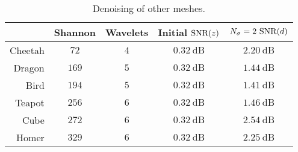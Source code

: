 \begin{table}
    \centering
    \caption[
        Denoising of other meshes
    ]{
        Denoising of other meshes.
    }\label{tab:chapter5_denoising}
    \begin{tabular}{@{}rcccc@{}}
        \toprule
                & Shannon       & Wavelets    & Initial \(\text{SNR}(z)\) & \(N_{\sigma}=2\ \snr{d}\) \\
        \midrule
        Cheetah & \(\num{72}\)  & \(\num{4}\) & \(\SI{0.32}{\dB}\)  & \(\SI{2.20}{\dB}\)        \\
        Dragon  & \(\num{169}\) & \(\num{5}\) & \(\SI{0.32}{\dB}\)  & \(\SI{1.44}{\dB}\)        \\
        Bird    & \(\num{194}\) & \(\num{5}\) & \(\SI{0.32}{\dB}\)  & \(\SI{1.41}{\dB}\)        \\
        Teapot  & \(\num{256}\) & \(\num{6}\) & \(\SI{0.32}{\dB}\)  & \(\SI{1.46}{\dB}\)        \\
        Cube    & \(\num{272}\) & \(\num{6}\) & \(\SI{0.32}{\dB}\)  & \(\SI{2.54}{\dB}\)        \\
        Homer   & \(\num{329}\) & \(\num{6}\) & \(\SI{0.32}{\dB}\)  & \(\SI{2.25}{\dB}\)        \\
        \bottomrule
    \end{tabular}
\end{table}
